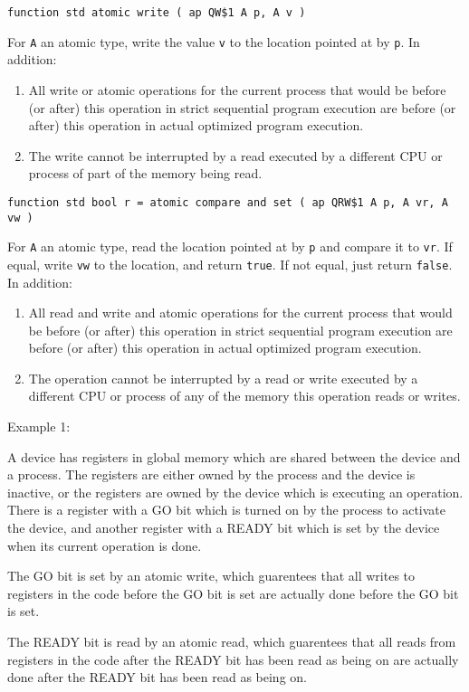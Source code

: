 \documentclass[12pt]{article}
\newenvironment{indpar}[1][0.3in]%
	{\begin{list}{}%
		     {\setlength{\itemsep}{0in}%
		      \setlength{\topsep}{0in}%
		      \setlength{\parsep}{1ex}%
		      \setlength{\labelwidth}{#1}%
		      \setlength{\leftmargin}{#1}%
		      \addtolength{\leftmargin}{\labelsep}}%
	 \item}%
	{\end{list}}
\begin{document}
{\tt function std atomic write ( ap QW\$1 A p, A v )}
\begin{indpar}
For {\tt A} an atomic type,
write the value {\tt v} to the location pointed at by {\tt p}.
In addition:
\begin{enumerate}
\item
All write or atomic operations for the current process that would be
before (or after) this operation in strict sequential program execution
are before (or after) this operation in actual optimized program execution.
\item
The write cannot be interrupted by a read executed by a different CPU
or process of part of the memory being read.
\end{enumerate}
\end{indpar}

{\tt function std bool r =
	atomic compare and set ( ap QRW\$1 A p, A vr, A vw )}
\begin{indpar}
For {\tt A} an atomic type,
read the location pointed at by {\tt p} and compare it to {\tt vr}.
If equal, write {\tt vw} to the location, and return {\tt true}.
If not equal, just return {\tt false}.
In addition:
\begin{enumerate}
\item
All read and write and atomic operations for the current process that would be
before (or after) this operation in strict sequential program execution
are before (or after) this operation in actual optimized program execution.
\item
The operation cannot be interrupted by a read or write
executed by a different CPU or process of any of the memory this operation
reads or writes.
\end{enumerate}
\end{indpar}

Example 1:
\begin{indpar}
A device has registers in global memory which are shared between the
device and a process.  The registers are either owned by the process
and the device is inactive, or the registers are owned by the device
which is executing an operation.  There is a register with a GO bit
which is turned on by the process to activate the device, and another
register with a READY bit which is set by the device when its current
operation is done.

The GO bit is set by an atomic write, which guarentees that all writes
to registers in the code before the GO bit is set are actually done
before the GO bit is set.

The READY bit is read by an atomic read, which guarentees that all reads
from registers in the code after the READY bit has been read as being on
are actually done after the READY bit has been read as being on.
\end{indpar}
\end{document}
